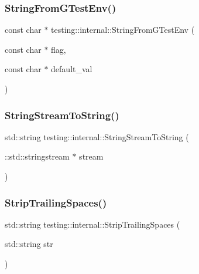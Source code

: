 \mbox{\label{namespacetesting_1_1internal_a7ed785df46a339403b0f749d3a879201}} 
\subsubsection{\texorpdfstring{StringFromGTestEnv()}{StringFromGTestEnv()}}
{\footnotesize\ttfamily const char $\ast$ testing\+::internal\+::\+String\+From\+G\+Test\+Env (\begin{DoxyParamCaption}\item[{const char $\ast$}]{flag,  }\item[{const char $\ast$}]{default\+\_\+val }\end{DoxyParamCaption})}

\mbox{\label{namespacetesting_1_1internal_ac0a2b7f69fc829d80a39e925b6417e39}} 
\subsubsection{\texorpdfstring{StringStreamToString()}{StringStreamToString()}}
{\footnotesize\ttfamily std\+::string testing\+::internal\+::\+String\+Stream\+To\+String (\begin{DoxyParamCaption}\item[{\+::std\+::stringstream $\ast$}]{stream }\end{DoxyParamCaption})}

\mbox{\label{namespacetesting_1_1internal_aa6afda12e567c353e2e9b9c2e8cae14f}} 
\subsubsection{\texorpdfstring{StripTrailingSpaces()}{StripTrailingSpaces()}}
{\footnotesize\ttfamily std\+::string testing\+::internal\+::\+Strip\+Trailing\+Spaces (\begin{DoxyParamCaption}\item[{std\+::string}]{str }\end{DoxyParamCaption})\hspace{0.3cm}{\ttfamily [inline]}}

